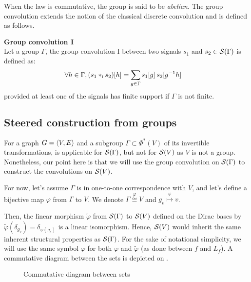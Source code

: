 When the law is commutative, the group is said to be \emph{abelian}.
The group convolution extends the notion of the classical discrete convolution and is defined as follows.

\begin{definition}\textbf{Group convolution I}\\
Let a group $\Gamma$, the group convolution I between two signals $s_1$ and $s_2 \in \mathcal{S}(\Gamma)$ is defined as:
\begin{align*}
\forall h \in \Gamma, (s_1 \ast_{\I} s_2)[h] & = \displaystyle \sum_{g \in \Gamma} s_1[g] \h{2} s_2[g^{-1}h]%
\end{align*}
provided at least one of the signals has finite support if $\Gamma$ is not finite.
\label{def:conv1}
\end{definition}

\subsection{Steered construction from groups}

For a graph $G = \langle V, E \rangle$ and a subgroup $\Gamma \subset \Phi^*(V)$ of its invertible transformations,  is applicable for $\mathcal{S}(\Gamma)$, but not for $\mathcal{S}(V)$ as $V$ is not a group. Nonetheless, our point here is that we will use the group convolution on $\mathcal{S}(\Gamma)$ to construct the convolutions on $\mathcal{S}(V)$.

For now, let's assume $\Gamma$ is in one-to-one correspondence with $V$, and let's define a bijective map $\varphi$ from $\Gamma$ to $V$. We denote $\Gamma \overset{\varphi}{\cong} V$ and $g_v \overset{\varphi}\mapsto v$.

Then, the linear morphism $\widetilde\varphi$ from $\mathcal{S}(\Gamma)$ to $\mathcal{S}(V)$ defined on the Dirac bases by $\widetilde\varphi(\delta_{g_v}) = \delta_{\varphi(g_v)}$ is a linear isomorphism. Hence, $\mathcal{S}(V)$ would inherit the same inherent structural properties as $\mathcal{S}(\Gamma)$. For the sake of notational simplicity, we will use the same symbol $\varphi$ for both $\varphi$ and $\widetilde\varphi$ (as done between $f$ and $L_f$). A commutative diagram between the sets is depicted on .

\begin{figure}[H]
\centering
{}%
\caption{Commutative diagram between sets}
\label{fig:iso}
\end{figure}

